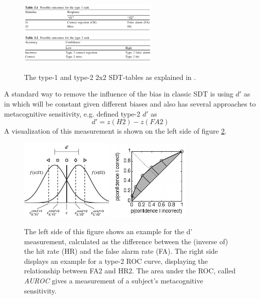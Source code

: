 \documentclass[../main/main.tex]{subfiles}
\begin{document}
	\begin{figure}[H]
		\centering
		\captionsetup{justification=centering}
		\includegraphics[width=0.6\textwidth]{../assets/type1_sdt_table.png}
		\includegraphics[width=0.6\textwidth]{../assets/type2_sdt_table.png}
		\caption{The type-1 and type-2 2x2 SDT-tables as explained in 						\citep{fleming2014measure}.} 
		\label{fig:tables}
	\end{figure}

	\noindent A standard way to remove the influence of the bias in classic SDT is using $d'$ as in \citep{green1966signal} which will be constant given different biases and also has several approaches to metacognitive sensitivity, e.g. \citep{kunimoto2001confidence} defined type-2 $d'$ as
	\begin{equation}
		d' = z(H2) - z(FA2)
	\end{equation}
	A visualization of this measurement is shown on the left side of figure \ref{fig:d_dash_and_roc}.
	\begin{figure}[H]
		\centering
		\captionsetup{justification=centering}
		\includegraphics[width=0.4\textwidth]{../assets/d_dash.png}
		\includegraphics[width=0.35\textwidth]{../assets/type1_roc.png}
		\caption{The left side of this figure shows an example for the d' measurement, calculated as the difference between the (inverse of) the hit rate (HR) and the false alarm rate (FA). The right side displays an example for a type-2 ROC curve, displaying the relationship between FA2 and HR2. The area under the ROC, called \textit{AUROC} gives a measurement of a subject's metacognitive sensitivity.} 
		\label{fig:d_dash_and_roc}
	\end{figure}
\end{document}

